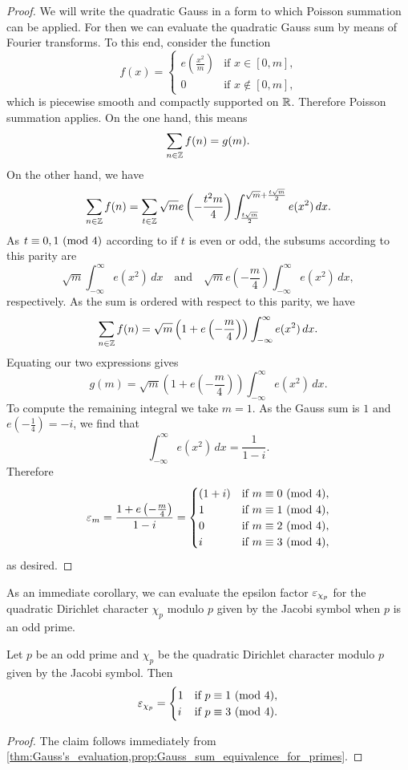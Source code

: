     \begin{proof}
      We will write the quadratic Gauss in a form to which Poisson summation can be applied. For then we can evaluate the quadratic Gauss sum by means of Fourier transforms. To this end, consider the function
      \[
        f(x) = \begin{cases} e\left(\frac{x^{2}}{m}\right) & \text{if \(x \in [0,m]\),} \\ 0 & \text{if \(x \notin [0,m]\),} \end{cases}
      \]
      which is piecewise smooth and compactly supported on \(\mathbb{R}\). Therefore Poisson summation applies. On the one hand, this means
      \[
        \sum_{n \in \mathbb{Z}}f(n) = g(m).
      \]
      On the other hand, we have
      \[
        \sum_{n \in \mathbb{Z}}f(n) = \sum_{t \in \mathbb{Z}}\sqrt{m}e\left(-\frac{t^{2}m}{4}\right)\int_{\frac{t\sqrt{m}}{2}}^{\sqrt{m}+\frac{t\sqrt{m}}{2}}e(x^{2})\,dx.
      \]
      As \(t \equiv 0,1 \ (\mathrm{mod}\text{ }4)\) according to if \(t\) is even or odd, the subsums according to this parity are
      \[
        \sqrt{m}\int_{-\infty}^{\infty}e(x^{2})\,dx \quad \text{and} \quad \sqrt{m}e\left(-\frac{m}{4}\right)\int_{-\infty}^{\infty}e(x^{2})\,dx,
      \]
      respectively. As the sum is ordered with respect to this parity, we have
      \[
        \sum_{n \in \mathbb{Z}}f(n) = \sqrt{m}\left(1+e\left(-\frac{m}{4}\right)\right)\int_{-\infty}^{\infty}e(x^{2})\,dx.
      \]
      Equating our two expressions gives
      \[
        g(m) = \sqrt{m}\left(1+e\left(-\frac{m}{4}\right)\right)\int_{-\infty}^{\infty}e(x^{2})\,dx.
      \]
      To compute the remaining integral we take \(m = 1\). As the Gauss sum is \(1\) and \(e\left(-\frac{1}{4}\right) = -i\), we find that
      \[
        \int_{-\infty}^{\infty}e(x^{2})\,dx = \frac{1}{1-i}.
      \]
      Therefore
      \[
        \varepsilon_{m} = \frac{1+e\left(-\frac{m}{4}\right)}{1-i} = \begin{cases} (1+i) & \text{if \(m \equiv 0 \ (\mathrm{mod}\text{ }4)\)}, \\ 1 & \text{if \(m \equiv 1 \ (\mathrm{mod}\text{ }4)\)}, \\ 0 & \text{if \(m \equiv 2 \ (\mathrm{mod}\text{ }4)\)}, \\ i & \text{if \(m \equiv 3 \ (\mathrm{mod}\text{ }4)\)}, \end{cases}
      \]
      as desired.
    \end{proof}

    As an immediate corollary, we can evaluate the epsilon factor \(\varepsilon_{\chi_{p}}\) for the quadratic Dirichlet character \(\chi_{p}\) modulo \(p\) given by the Jacobi symbol when \(p\) is an odd prime.

    \begin{corollary}
      Let \(p\) be an odd prime and \(\chi_{p}\) be the quadratic Dirichlet character modulo \(p\) given by the Jacobi symbol. Then
      \[
        \varepsilon_{\chi_{p}} = \begin{cases} 1 & \text{if \(p \equiv 1 \ (\mathrm{mod}\text{ }4)\)}, \\ i & \text{if \(p \equiv 3 \ (\mathrm{mod}\text{ }4)\)}. \end{cases}
      \]
    \end{corollary}
    \begin{proof}
      The claim follows immediately from \cref{thm:Gauss's_evaluation,prop:Gauss_sum_equivalence_for_primes}.
    \end{proof}